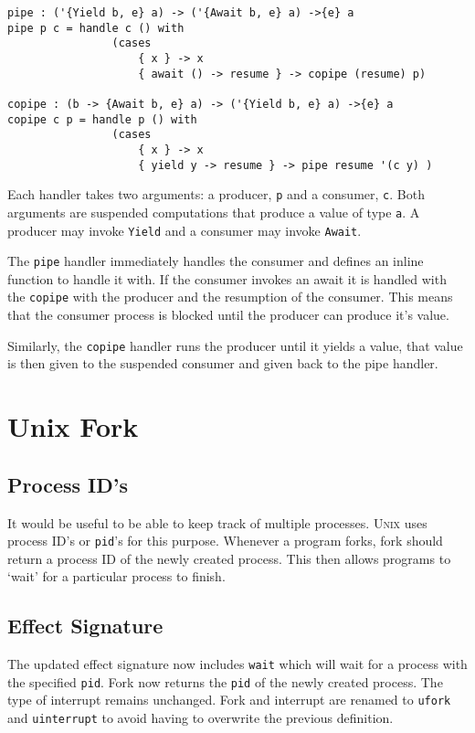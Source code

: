 \documentclass[logo,bsc,singlespacing,parskip]{infthesis}
\begin{document}
\begin{lstlisting}[language=unison]
pipe : ('{Yield b, e} a) -> ('{Await b, e} a) ->{e} a
pipe p c = handle c () with
                (cases
                    { x } -> x
                    { await () -> resume } -> copipe (resume) p)

copipe : (b -> {Await b, e} a) -> ('{Yield b, e} a) ->{e} a
copipe c p = handle p () with
                (cases
                    { x } -> x
                    { yield y -> resume } -> pipe resume '(c y) )
\end{lstlisting}

Each handler takes two arguments: a producer, \texttt{p} and a consumer,
\texttt{c}. Both arguments are suspended computations that produce a value of
type \texttt{a}. A producer may invoke \texttt{Yield} and a consumer may invoke
\texttt{Await}.

The \texttt{pipe} handler immediately handles the consumer and defines an
inline function to handle it with. If the consumer invokes an await it is
handled with the \texttt{copipe} with the producer and the resumption of the
consumer. This means that the consumer process is blocked until the producer
can produce it's value.

Similarly, the \texttt{copipe} handler runs the producer until it yields a
value, that value is then given to the suspended consumer and given back to the
pipe handler.

\section{Unix Fork}

\subsection{Process ID's}

It would be useful to be able to keep track of multiple processes.
\textsc{Unix} uses process ID's or \texttt{pid}'s for this purpose. Whenever a
program forks, fork should return a process ID of the newly created process. 
This then allows programs to `wait' for a particular process to finish.

\subsection{Effect Signature}

The updated effect signature now includes \texttt{wait} which will wait for a
process with the specified \texttt{pid}. Fork now returns the \texttt{pid} of
the newly created process. The type of interrupt remains unchanged. Fork and
interrupt are renamed to \texttt{ufork} and \texttt{uinterrupt} to avoid having
to overwrite the previous definition.
\end{document}

